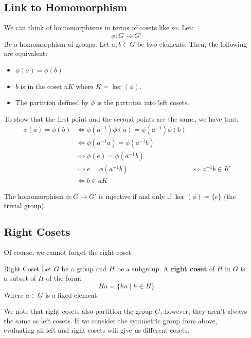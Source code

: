 \documentclass[letterpaper]{article}
\begin{document}
\subsection{Link to Homomorphism}
We can think of homomorphisms in terms of cosets like so. Let: 
\[\phi: G \to G'\]
Be a homomorphism of groups. Let $a, b \in G$ be two elements. Then, the following are equivalent: 
\begin{itemize}
    \item $\phi(a) = \phi(b)$
    \item $b$ is in the coset $aK$ where $K = \ker(\phi)$. 
    \item The partition defined by $\phi$ is the partition into left cosets. 
\end{itemize}
To show that the first point and the second points are the same, we have that: 
\begin{equation*}
    \begin{aligned}
        \phi(a) = \phi(b) &\iff \phi(a^{-1}) \phi(a) = \phi(a^{-1}) \phi(b) \\ 
            &\iff \phi(a^{-1}a) = \phi(a^{-1}b) \\ 
            &\iff \phi(e) = \phi(a^{-1} b) \\ 
            &\iff e = \phi(a^{-1} b)
            &\iff a^{-1} b \in K \\ 
            &\iff b \in aK 
    \end{aligned}
\end{equation*}

\begin{corollary}{}{}
    The homomorphism $\phi: G \to G'$ is injective if and only if $\ker(\phi) = \{e\}$ (the trivial group). 
\end{corollary}


\subsection{Right Cosets}
Of course, we cannot forget the right coset. 
\begin{definition}{Right Coset}{}
    Let $G$ be a group and $H$ be a subgroup. A \textbf{right coset} of $H$ in $G$ is a subset of $H$ of the form:  
    \[Ha = \{ha \mid h \in H\}\]
    Where $a \in G$ is a fixed element. 
\end{definition}

We note that right cosets also partition the group $G$; however, they aren't always the same as left cosets. If we consider the symmetric group from above, evaluating all left and right cosets will give us different cosets. 
\end{document}
